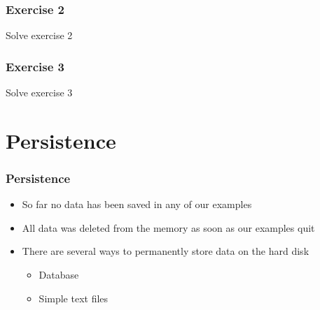\documentclass[10pt, a4paper]{beamer} %
\begin{document}
\begin{frame}
\begin{table}
	\end{table}


\end{frame}

{
\bfseries
\begin{frame}[c, fragile]\frametitle{Exercise 2}

	Solve exercise 2
\end{frame}

\begin{frame}[c, fragile]\frametitle{Exercise 3}
	Solve exercise 3
\end{frame}

}

\section{Persistence} %
\label{sec:persistence}

\begin{frame}[c, fragile]\frametitle{Persistence}
	\begin{itemize}
		\item So far no data has been saved in any of our examples
		\item All data was deleted from the memory as soon as our examples quit
		\item There are several ways to permanently store data on the hard disk
		      \begin{itemize}
			      \item Database
			      \item Simple text files
		      \end{itemize}
	\end{itemize}
\end{frame}
\end{document}
